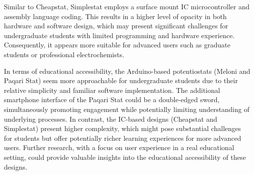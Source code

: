 \documentclass{article}
\begin{document}
Similar to Cheapstat, Simplestat employs a surface mount IC microcontroller and assembly language coding. This results in a higher level of opacity in both hardware and software design, which may present significant challenges for undergraduate students with limited programming and hardware experience. Consequently, it appears more suitable for advanced users such as graduate students or professional electrochemists.

In terms of educational accessibility, the Arduino-based potentiostats (Meloni and Paqari Stat) seem more approachable for undergraduate students due to their relative simplicity and familiar software implementation. The additional smartphone interface of the Paqari Stat could be a double-edged sword, simultaneously promoting engagement while potentially limiting understanding of underlying processes. In contrast, the IC-based designs (Cheapstat and Simplestat) present higher complexity, which might pose substantial challenges for students but offer potentially richer learning experiences for more advanced users. Further research, with a focus on user experience in a real educational setting, could provide valuable insights into the educational accessibility of these designs.
\end{document}
